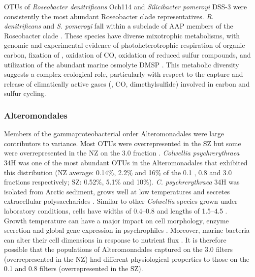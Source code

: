 \acp{OTU} of \emph{Roseobacter denitrificans} Och114 and \emph{Silicibacter pomeroyi} DSS-3 were consistently the most abundant Roseobacter clade representatives.
\emph{R. denitrificans} and \emph{S. pomeroyi} fall within a subclade of \ac{AAP} members of the Roseobacter clade \cite{Swingley:2007dm}.
These species have diverse mixotrophic metabolisms, with genomic and experimental evidence of photoheterotrophic respiration of organic carbon, fixation of , oxidation of CO, oxidation of reduced sulfur compounds, and utilization of the abundant marine osmolyte \ac{DMSP} \cite{King:2003kc,Moran:2004ie,WagnerDobler:2006kb,Swingley:2007dm,Brinkhoff:2008do,Howard:2008hf}.
This metabolic diversity suggests a complex ecological role, particularly with respect to the capture and release of climatically active gases (, CO, dimethylsulfide) involved in carbon and sulfur cycling.

\subsubsection{Alteromondales}

Members of the gammaproteobacterial order Alteromonadales were large contributors to variance.
Most \acp{OTU} were overrepresented in the \ac{SZ} but some were overrepresented in the \ac{NZ} on the 3.0 \micron{} fraction .
\emph{Colwellia psychrerythraea} 34H was one of the most abundant \acp{OTU} in the Alteromonadales that exhibited this distribution (\ac{NZ} average: 0.14\%, 2.2\% and 16\% of the 0.1 \micron{}, 0.8 \micron{} and 3.0 \micron{} fractions respectively; \ac{SZ}: 0.52\%, 5.1\% and 10\%).
\emph{C. psychrerythraea} 34H was isolated from Arctic sediment, grows well at low temperatures and secretes extracellular polysaccharides \cite{Huston:2000jr,Junge:2003kb,Methe:2005uf}.
Similar to other \emph{Colwellia} species grown under laboratory conditions, cells have widths of 0.4--0.8 \micron{} and lengths of 1.5--4.5 \micron{} \cite{Jung:2006fh}.
Growth temperature can have a major impact on cell morphology, enzyme secretion and global gene expression in psychrophiles \citep[e.g.][]{Feller:2003ir,Junge:2003kb,Williams:2011hy,Cavicchioli:2006bl,Campanaro:2011gj}.
Moreover, marine bacteria can alter their cell dimensions in response to nutrient flux \citep[e.g.][]{Kjelleberg:1987wp}.
It is therefore possible that the populations of Alteromonadales captured on the 3.0 \micron{} filters (overrepresented in the \ac{NZ}) had different physiological properties to those on the 0.1 and 0.8 \micron{} filters (overrepresented in the \ac{SZ}).

